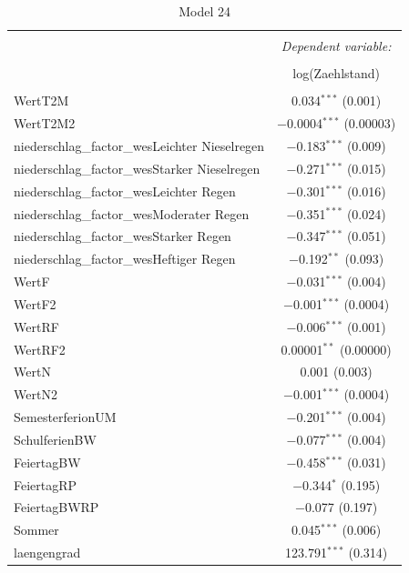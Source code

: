 \documentclass[a4paper,12pt]{thesis}
\begin{document}
\begin{table}[!htbp] \centering 
	\caption{Model 24} 
	\label{FinalFinalModel} 
	\small 
	\begin{tabular}{@{\extracolsep{-15pt}}lc} 
		\\[-1.8ex]\hline 
		\hline \\[-1.8ex] 
		& \multicolumn{1}{c}{\textit{Dependent variable:}} \\ 
		\cline{2-2} 
		\\[-1.8ex] & log(Zaehlstand) \\ 
		\hline \\[-1.8ex] 
		WertT2M & 0.034$^{***}$ (0.001) \\ 
		WertT2M2 & $-$0.0004$^{***}$ (0.00003) \\ 
		niederschlag\_factor\_wesLeichter Nieselregen & $-$0.183$^{***}$ (0.009) \\ 
		niederschlag\_factor\_wesStarker Nieselregen & $-$0.271$^{***}$ (0.015) \\ 
		niederschlag\_factor\_wesLeichter Regen & $-$0.301$^{***}$ (0.016) \\ 
		niederschlag\_factor\_wesModerater Regen & $-$0.351$^{***}$ (0.024) \\ 
		niederschlag\_factor\_wesStarker Regen & $-$0.347$^{***}$ (0.051) \\ 
		niederschlag\_factor\_wesHeftiger Regen & $-$0.192$^{**}$ (0.093) \\ 
		WertF & $-$0.031$^{***}$ (0.004) \\ 
		WertF2 & $-$0.001$^{***}$ (0.0004) \\ 
		WertRF & $-$0.006$^{***}$ (0.001) \\ 
		WertRF2 & 0.00001$^{**}$ (0.00000) \\ 
		WertN & 0.001 (0.003) \\ 
		WertN2 & $-$0.001$^{***}$ (0.0004) \\ 
		SemesterferionUM & $-$0.201$^{***}$ (0.004) \\ 
		SchulferienBW & $-$0.077$^{***}$ (0.004) \\ 
		FeiertagBW & $-$0.458$^{***}$ (0.031) \\ 
		FeiertagRP & $-$0.344$^{*}$ (0.195) \\ 
		FeiertagBWRP & $-$0.077 (0.197) \\ 
		Sommer & 0.045$^{***}$ (0.006) \\ 
		laengengrad & 123.791$^{***}$ (0.314) \\ 

\end{tabular}
\end{table}
\end{document}
